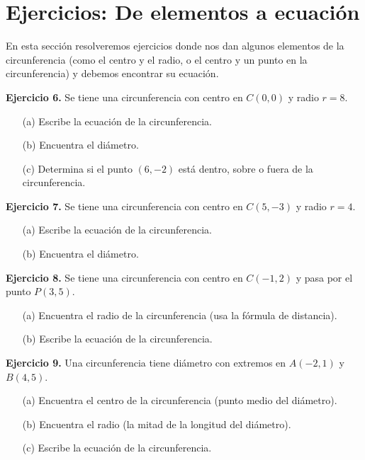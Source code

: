 \documentclass[12pt,a4paper]{article}
\begin{document}
	\section{Ejercicios: De elementos a ecuación}

	En esta sección resolveremos ejercicios donde nos dan algunos elementos de la circunferencia (como el centro y el radio, o el centro y un punto en la circunferencia) y debemos encontrar su ecuación.

	\bigskip

	\textbf{Ejercicio 6.} Se tiene una circunferencia con centro en $C(0,0)$ y radio $r=8$.
	\begin{itemize}
		\item[(a)] Escribe la ecuación de la circunferencia.
		\item[(b)] Encuentra el diámetro.
		\item[(c)] Determina si el punto $(6,-2)$ está dentro, sobre o fuera de la circunferencia.
	\end{itemize}

	\bigskip

	\textbf{Ejercicio 7.} Se tiene una circunferencia con centro en $C(5,-3)$ y radio $r=4$.
	\begin{itemize}
		\item[(a)] Escribe la ecuación de la circunferencia.
		\item[(b)] Encuentra el diámetro.
	\end{itemize}

	\bigskip

	\textbf{Ejercicio 8.} Se tiene una circunferencia con centro en $C(-1,2)$ y pasa por el punto $P(3,5)$.
	\begin{itemize}
		\item[(a)] Encuentra el radio de la circunferencia (usa la fórmula de distancia).
		\item[(b)] Escribe la ecuación de la circunferencia.
	\end{itemize}

	\bigskip

	\textbf{Ejercicio 9.} Una circunferencia tiene diámetro con extremos en $A(-2,1)$ y $B(4,5)$.
	\begin{itemize}
		\item[(a)] Encuentra el centro de la circunferencia (punto medio del diámetro).
		\item[(b)] Encuentra el radio (la mitad de la longitud del diámetro).
		\item[(c)] Escribe la ecuación de la circunferencia.
	\end{itemize}
\end{document}
